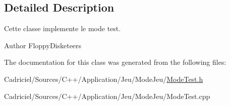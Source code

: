 \subsection{Detailed Description}
Cette classe implemente le mode test. 

\begin{DoxyAuthor}{Author}
Floppy\-Disketeers 
\end{DoxyAuthor}


The documentation for this class was generated from the following files\-:\begin{DoxyCompactItemize}
\item 
Cadriciel/\-Sources/\-C++/\-Application/\-Jeu/\-Mode\-Jeu/\hyperlink{_mode_test_8h}{Mode\-Test.\-h}\item 
Cadriciel/\-Sources/\-C++/\-Application/\-Jeu/\-Mode\-Jeu/Mode\-Test.\-cpp\end{DoxyCompactItemize}

